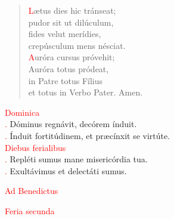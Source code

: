 \begin{verse}
\hspace{3.5cm} \textcolor{red}{L}ætus dies hic tránseat; \\
\hspace{3.5cm} pudor sit ut dilúculum, \\
\hspace{3.5cm} fides velut merídies,\\
\hspace{3.5cm} crepúsculum mens nésciat.\\

\hspace{3.5cm} \textcolor{red}{A}uróra cursus próvehit; \\
\hspace{3.5cm} Auróra totus pródeat,\\
\hspace{3.5cm} in Patre totus Fílius\\
\hspace{3.5cm} et totus in Verbo Pater. Amen.\\

      \end{verse}

\vspace{0.4cm}

\noindent\textcolor{red}{Dominica}\\
\textcolor{red}{\Vbar.} Dóminus regnávit, decórem índuit.\\
\noindent \textcolor{red}{\Rbar.} Índuit fortitúdinem, et præcínxit se virtúte.\\
\noindent\textcolor{red}{Diebus ferialibus}\\
\textcolor{red}{\Vbar.} Repléti sumus  mane misericórdia tua.\\
\noindent \textcolor{red}{\Rbar.} Exultávimus et delectáti sumus.





\vspace{0.4cm}
\begin{center}
 \small{\textcolor{red}{Ad Benedictus}}
\end{center}
\noindent\textcolor{red}{Feria secunda}\\
\gresetfirstlineaboveinitial{\small \textcolor{red}{\bf }}{\small \bf }
\setaboveinitialseparation{0.92mm}
\vspace{0.6cm}

